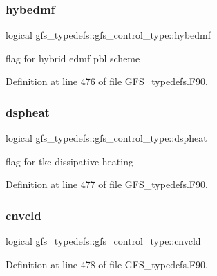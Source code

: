 \subsubsection{hybedmf}
{\footnotesize\ttfamily logical gfs\+\_\+typedefs\+::gfs\+\_\+control\+\_\+type\+::hybedmf}



flag for hybrid edmf pbl scheme 



Definition at line 476 of file G\+F\+S\+\_\+typedefs.\+F90.

\mbox{\label{structgfs__typedefs_1_1gfs__control__type_abd651ddc08057e2fad190743d7299ccd}} 
\subsubsection{dspheat}
{\footnotesize\ttfamily logical gfs\+\_\+typedefs\+::gfs\+\_\+control\+\_\+type\+::dspheat}



flag for tke dissipative heating 



Definition at line 477 of file G\+F\+S\+\_\+typedefs.\+F90.

\mbox{\label{structgfs__typedefs_1_1gfs__control__type_ac9e036de2e9ac72528bb7bafac2a0709}} 
\subsubsection{cnvcld}
{\footnotesize\ttfamily logical gfs\+\_\+typedefs\+::gfs\+\_\+control\+\_\+type\+::cnvcld}



Definition at line 478 of file G\+F\+S\+\_\+typedefs.\+F90.

\mbox{\label{structgfs__typedefs_1_1gfs__control__type_aedb3dcd018633b2fc6b394695f7b9657}} 
